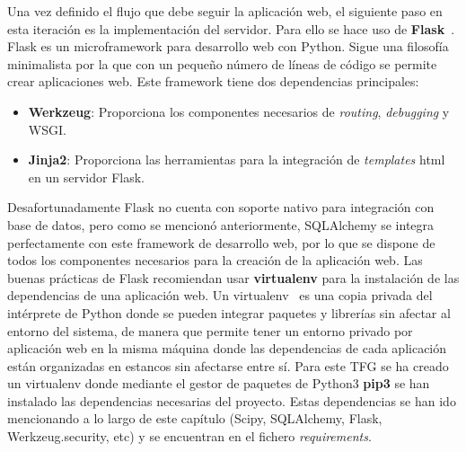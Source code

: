 Una vez definido el flujo que debe seguir la aplicación web, el siguiente paso en esta iteración es la implementación del servidor. Para ello se hace uso de \textbf{Flask}~\cite{Grinb14}. Flask es un microframework para desarrollo web con Python. Sigue una filosofía minimalista por la que con un pequeño número de líneas de código se permite crear aplicaciones web. Este framework tiene dos dependencias principales:
\begin{itemize}
\item \textbf{Werkzeug}: Proporciona los componentes necesarios de \textit{routing}, \textit{debugging} y \gls{WSGI}.
\item \textbf{Jinja2}: Proporciona las herramientas para la integración de \textit{templates} html en un servidor Flask.
\end{itemize}
Desafortunadamente Flask no cuenta con soporte nativo para integración con base de datos, pero como se mencionó anteriormente, SQLAlchemy se integra perfectamente con este framework de desarrollo web, por lo que se dispone de todos los componentes necesarios para la creación de la aplicación web. Las buenas prácticas de Flask recomiendan usar \textbf{virtualenv} para la instalación de las dependencias de una aplicación web. Un virtualenv~\cite{VirPy} es una copia privada del intérprete de Python donde se pueden integrar paquetes y librerías sin afectar al entorno del sistema, de manera que permite tener un entorno privado por aplicación web en la misma máquina donde las dependencias de cada aplicación están organizadas en estancos sin afectarse entre sí. Para este \gls{TFG} se ha creado un virtualenv donde mediante el gestor de paquetes de Python3 \textbf{pip3} se han instalado las dependencias necesarias del proyecto. Estas dependencias se han ido mencionando a lo largo de este capítulo (Scipy, SQLAlchemy, Flask, Werkzeug.security, etc) y se encuentran en el fichero \textit{requirements}.\\

